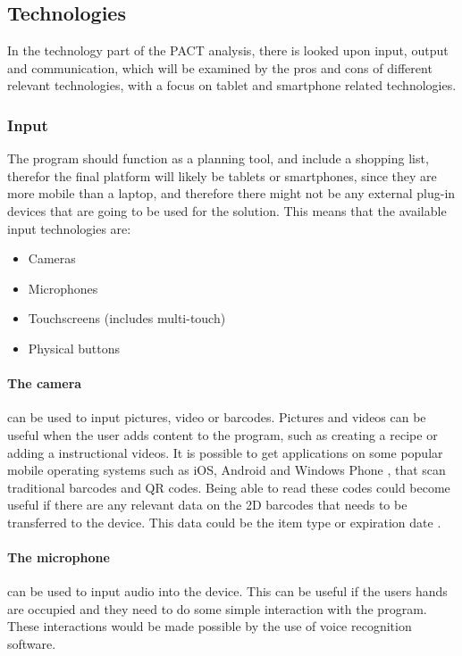 \subsection{Technologies}
In the technology part of the PACT analysis, there is looked upon input, output and communication, which will be examined by the pros and cons of different relevant technologies, with a focus on tablet and smartphone related technologies.

\subsubsection{Input}
The program should function as a planning tool, and include a shopping list, therefor the final platform will likely be tablets or smartphones, since they are more mobile than a laptop, and therefore there might not be any external plug-in devices that are going to be used for the solution. This means that the available input technologies are:
\begin{itemize}
    \item Cameras
    \item Microphones
    \item Touchscreens (includes multi-touch)
    \item Physical buttons
\end{itemize}

\paragraph{The camera} can be used to input pictures, video or barcodes. Pictures and videos can be useful when the user adds content to the program, such as creating a recipe or adding a instructional videos. It is possible to get applications on some popular mobile operating systems such as iOS, Android and Windows Phone \cite{barcode_Phones}, that scan traditional barcodes and QR codes. Being able to read these codes could become useful if there are any relevant data on the 2D barcodes that needs to be transferred to the device. This data could be the item type or expiration date \cite{barcodeInc_FAQ}.           
    
\paragraph{The microphone} can be used to input audio into the device. This can be useful if the users hands are occupied and they need to do some simple interaction with the program. These interactions would be made possible by the use of voice recognition software.

